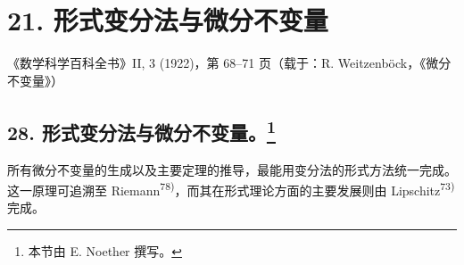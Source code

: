 \section*{21. 形式变分法与微分不变量}
\begin{center}
《数学科学百科全书》II, 3 (1922)，第 68--71 页（载于：R. Weitzenböck，《微分不变量》）
\end{center}

\begingroup
\renewcommand{\thefootnote}{\arabic{footnote})}
\setcounter{footnote}{148}
\subsection*{28. 形式变分法与微分不变量。\footnote{本节由 E. Noether 撰写。}}

所有微分不变量的生成以及主要定理的推导，最能用变分法的形式方法统一完成。这一原理可追溯至 Riemann\textsuperscript{78)}，而其在形式理论方面的主要发展则由 Lipschitz\textsuperscript{73)} 完成。


